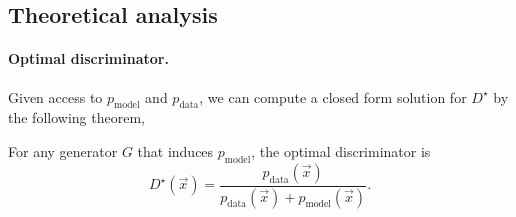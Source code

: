 \subsection{Theoretical analysis}

\paragraph{Optimal discriminator.}

Given access to $p_{\mathrm{model}}$ and $p_{\mathrm{data}}$, we can compute a closed form solution for $D^\star$ by the
following theorem,

\begin{theorem}
    For any generator $G$ that induces $p_{\mathrm{model}}$, the optimal discriminator is \[
        D^\star(\vec{x}) = \frac{p_{\mathrm{data}}(\vec{x})}{p_{\mathrm{data}}(\vec{x}) + p_{\mathrm{model}}(\vec{x})}.
    \]
\end{theorem}

